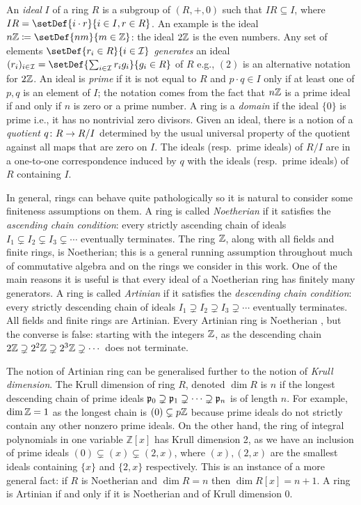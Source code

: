 \documentclass[runningheads]{llncs}
\begin{document}
  An \emph{ideal} $I$ of a ring $R$ is a subgroup of $(R, +,0)$ such that  $IR \subseteq I$, where $IR =\setDef{i\cdot r }{i\in I, r\in R}$.
  An example is the ideal $n\Z \coloneqq \setDef{nm}{m\in \Z}$: the ideal $2\mathbb{Z}$ is the even numbers. Any set of elements $\setDef{r_i\in R}{ i \in \mathcal I}$ \emph{generates} an ideal $(r_i)_{i \in \mathcal I} = \setDef{\sum_{i\in \mathcal I} r_ig_i }{g_i \in R }$ of  $R$ e.g., $(2)$ is an alternative notation for $2\mathbb{Z}$. An ideal is \emph{prime} if it is not equal to $R$  and $p\cdot q \in I$ only if at least one of $p,q$ is an element of $I$; the notation comes from the fact that $n\mathbb{Z}$ is a prime ideal if and only if $n$ is zero or a prime number. A ring is a \emph{domain} if the ideal $\{0\}$ is prime i.e., it has no nontrivial zero divisors. Given an ideal, there is a notion of a \emph{quotient} $q\colon R \to R/I$ determined by the usual universal property of the quotient against all maps that are zero on $I.$ The ideals (resp.\ prime ideals) of $R/I$ are in a one-to-one correspondence induced by $q$ with the ideals (resp.\ prime ideals)  of $R$ containing $I$.

In general, rings can behave quite pathologically so it is natural to consider some finiteness assumptions on them.  A ring is called \emph{Noetherian} if it satisfies the \emph{ascending chain condition}: every strictly ascending chain of ideals $I_1 \subsetneq I_2 \subsetneq I_3 \subsetneq  \cdots $ eventually terminates. The ring $\mathbb{Z}$, along with all fields and finite rings, is Noetherian; this is a general running assumption throughout much of commutative algebra and on the rings we consider in this work. One of the main reasons it is useful is that every ideal of a Noetherian ring has finitely many generators. A ring is called \emph{Artinian} if it satisfies the \emph{descending chain condition}: every strictly descending chain of ideals $I_1 \supsetneq I_2 \supsetneq I_3 \supsetneq  \cdots $ eventually terminates.  All fields and finite rings are Artinian. Every Artinian ring is Noetherian \cite[Theorem 2.14]{eisenbud95}, but the converse is false: starting with the integers $\mathbb{Z}$, as the descending chain $2\mathbb{Z}\supsetneq 2^2\mathbb{Z} \supsetneq  2^3 \mathbb{Z} \supsetneq  \cdots $ does not terminate. 
 
The notion of Artinian ring can be generalised further to the notion of \emph{Krull dimension}. The Krull dimension of ring $R$, denoted $\dim R$ is $n$ if the longest descending chain of prime ideals $\mathfrak p_0 \supsetneq \mathfrak p_1 \supsetneq \cdots  \supsetneq \mathfrak p_n$ is of length $n$. For example, $\dim \mathbb{Z} =1 $ as the longest chain is $(0) \subsetneq p\mathbb{Z}$ because prime ideals do not strictly contain any other nonzero prime ideals. On the other hand, the ring of integral polynomials in one variable $\mathbb Z[x]$ has Krull dimension 2, as we have an inclusion of prime ideals $(0) \subsetneq (x)  \subsetneq (2, x)$, where $(x), (2,x)$  are the smallest ideals containing $\{x\}$ and $\{2,x\}$ respectively. This is an instance of a more general fact: if  $R$ is Noetherian and $\dim R = n$ then $\dim R[x] = n+1.$ A ring is Artinian if and only if it is Noetherian and of Krull dimension 0.
\end{document}
